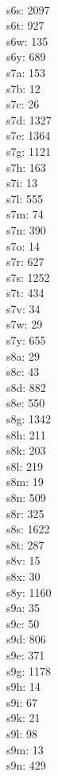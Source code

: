 \begin{multicols}{8}
  \\ s6s: 2097
  \\ s6t: 927
  \\ s6w: 135
  \\ s6y: 689
  \\ s7a: 153
  \\ s7b: 12
  \\ s7c: 26
  \\ s7d: 1327
  \\ s7e: 1364
  \\ s7g: 1121
  \\ s7h: 163
  \\ s7i: 13
  \\ s7l: 555
  \\ s7m: 74
  \\ s7n: 390
  \\ s7o: 14
  \\ s7r: 627
  \\ s7s: 1252
  \\ s7t: 434
  \\ s7v: 34
  \\ s7w: 29
  \\ s7y: 655
  \\ s8a: 29
  \\ s8c: 43
  \\ s8d: 882
  \\ s8e: 550
  \\ s8g: 1342
  \\ s8h: 211
  \\ s8k: 203
  \\ s8l: 219
  \\ s8m: 19
  \\ s8n: 509
  \\ s8r: 325
  \\ s8s: 1622
  \\ s8t: 287
  \\ s8v: 15
  \\ s8x: 30
  \\ s8y: 1160
  \\ s9a: 35
  \\ s9c: 50
  \\ s9d: 806
  \\ s9e: 371
  \\ s9g: 1178
  \\ s9h: 14
  \\ s9i: 67
  \\ s9k: 21
  \\ s9l: 98
  \\ s9m: 13
  \\ s9n: 429

\end{multicols}
